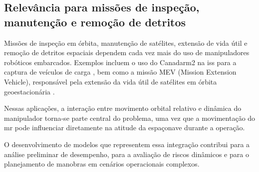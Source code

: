 \subsection{Relevância para missões de inspeção, manutenção e remoção de detritos}

Missões de inspeção em órbita, manutenção de satélites, extensão de vida útil e remoção de detritos espaciais dependem cada vez mais do uso de manipuladores robóticos embarcados.
Exemplos incluem o uso do Canadarm2 na \gls{iss} para a captura de veículos de carga \cite{canadarm2}, bem como a missão MEV (Mission Extension Vehicle), responsável pela extensão da vida útil de satélites em órbita geoestacionária \cite{mev_northrop}.

Nessas aplicações, a interação entre movimento orbital relativo e dinâmica do manipulador torna-se parte central do problema, uma vez que a movimentação do \gls{mr} pode influenciar diretamente na atitude da espaçonave durante a operação.

O desenvolvimento de modelos que representem essa integração contribui para a análise preliminar de desempenho, para a avaliação de riscos dinâmicos e para o planejamento de manobras em cenários operacionais complexos.